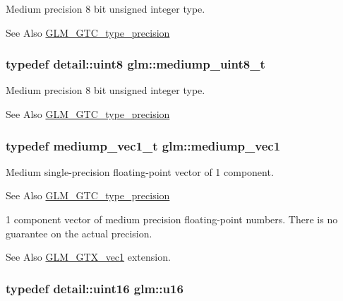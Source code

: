 Medium precision 8 bit unsigned integer type. \begin{DoxySeeAlso}{See Also}
\hyperlink{group__gtc__type__precision}{G\-L\-M\-\_\-\-G\-T\-C\-\_\-type\-\_\-precision} 
\end{DoxySeeAlso}
\hypertarget{group__gtc__type__precision_gadfa38f3c245d371c4b2079f1fd68928b}{
\subsubsection[{mediump\-\_\-uint8\-\_\-t}]{\setlength{\rightskip}{0pt plus 5cm}typedef detail\-::uint8 {\bf glm\-::mediump\-\_\-uint8\-\_\-t}}}\label{group__gtc__type__precision_gadfa38f3c245d371c4b2079f1fd68928b}
Medium precision 8 bit unsigned integer type. \begin{DoxySeeAlso}{See Also}
\hyperlink{group__gtc__type__precision}{G\-L\-M\-\_\-\-G\-T\-C\-\_\-type\-\_\-precision} 
\end{DoxySeeAlso}
\hypertarget{group__gtc__type__precision_ga1b734d715033ab3026b2fb27e1fb7d3e}{
\subsubsection[{mediump\-\_\-vec1}]{\setlength{\rightskip}{0pt plus 5cm}typedef mediump\-\_\-vec1\-\_\-t {\bf glm\-::mediump\-\_\-vec1}}}\label{group__gtc__type__precision_ga1b734d715033ab3026b2fb27e1fb7d3e}
Medium single-\/precision floating-\/point vector of 1 component. \begin{DoxySeeAlso}{See Also}
\hyperlink{group__gtc__type__precision}{G\-L\-M\-\_\-\-G\-T\-C\-\_\-type\-\_\-precision}
\end{DoxySeeAlso}
1 component vector of medium precision floating-\/point numbers. There is no guarantee on the actual precision. \begin{DoxySeeAlso}{See Also}
\hyperlink{group__gtx__vec1}{G\-L\-M\-\_\-\-G\-T\-X\-\_\-vec1} extension. 
\end{DoxySeeAlso}
\hypertarget{group__gtc__type__precision_gae7a1571503f83d2264ddfa705a6b082a}{
\subsubsection[{u16}]{\setlength{\rightskip}{0pt plus 5cm}typedef detail\-::uint16 {\bf glm\-::u16}}}\label{group__gtc__type__precision_gae7a1571503f83d2264ddfa705a6b082a}
